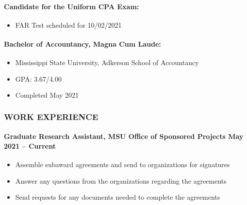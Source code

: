 \documentclass[
]{article}
\providecommand{\tightlist}{%
  \setlength{\itemsep}{0pt}\setlength{\parskip}{0pt}}
\begin{document}
\hypertarget{candidate-for-the-uniform-cpa-exam}{%
\paragraph{Candidate for the Uniform CPA
Exam:}\label{candidate-for-the-uniform-cpa-exam}}

\begin{itemize}
\tightlist
\item
  FAR Test scheduled for 10/02/2021
\end{itemize}

\hypertarget{bachelor-of-accountancy-magna-cum-laude}{%
\paragraph{Bachelor of Accountancy, Magna Cum
Laude:}\label{bachelor-of-accountancy-magna-cum-laude}}

\begin{itemize}
\tightlist
\item
  Mississippi State University, Adkerson School of Accountancy\\
\item
  GPA: 3.67/4.00
\item
  Completed May 2021
\end{itemize}

\hypertarget{work-experience}{%
\subsubsection{WORK EXPERIENCE}\label{work-experience}}

\hypertarget{graduate-research-assistant-msu-office-of-sponsored-projects-may-2021-current}{%
\paragraph{Graduate Research Assistant, MSU Office of Sponsored Projects
May 2021 --
Current}\label{graduate-research-assistant-msu-office-of-sponsored-projects-may-2021-current}}

\begin{itemize}
\tightlist
\item
  Assemble subaward agreements and send to organizations for signatures
\item
  Answer any questions from the organizations regarding the agreements
\item
  Send requests for any documents needed to complete the agreements
\end{itemize}
\end{document}
